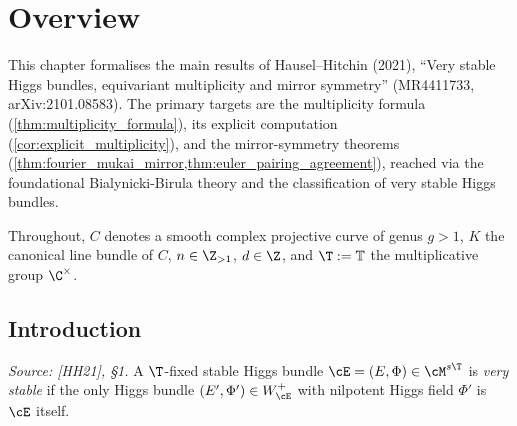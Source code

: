 \chapter{Overview}
\label{chap:overview}


This chapter formalises the main results of Hausel--Hitchin (2021), ``Very stable Higgs bundles,
equivariant multiplicity and mirror symmetry'' (MR4411733, arXiv:2101.08583).  The primary
targets are the multiplicity formula (\cref{thm:multiplicity_formula}), its explicit computation
(\cref{cor:explicit_multiplicity}), and the mirror-symmetry theorems
(\cref{thm:fourier_mukai_mirror,thm:euler_pairing_agreement}), reached via the foundational
Bialynicki-Birula theory and the classification of very stable Higgs bundles.

Throughout, \(C\) denotes a smooth complex projective curve of genus \(g > 1\), \(K\) the
canonical line bundle of \(C\), \(n \in \Z_{>1}\), \(d \in \Z\), and \(\T := \mathbb{T}\) the
multiplicative group \(\C^{\times}\).

\section{Introduction}

\begin{definition}
  \label{def:very_stable_Higgs}
  \textit{Source: [HH21], §1.}
  A \(\T\)-fixed stable Higgs bundle \(\cE = (E, \Phi) \in \cM^{s\T}\) is \emph{very stable} if
  the only Higgs bundle \((E', \Phi') \in W^+_{\cE}\) with nilpotent Higgs field \(\Phi'\) is
  \(\cE\) itself.
\end{definition}

